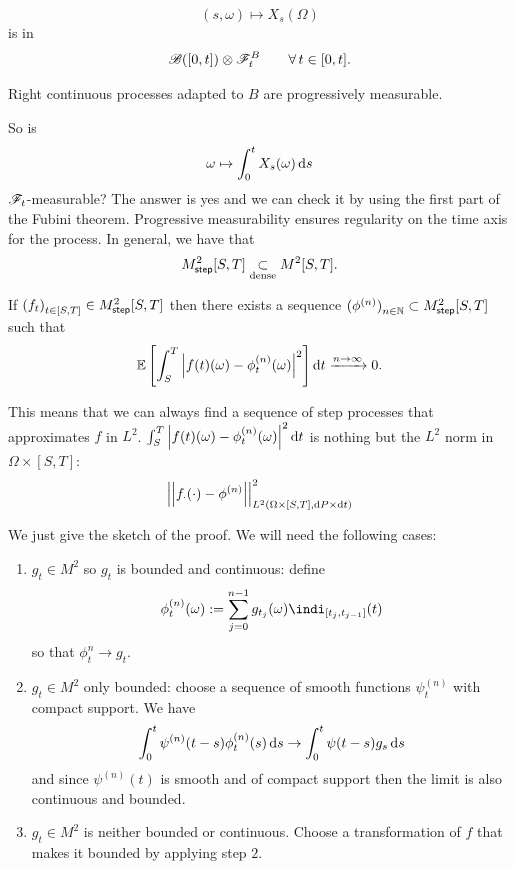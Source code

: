 \documentclass[12pt]{report}
\begin{document}
\begin{equation*}
	(s,\omega)\mapsto X_{s}(\Omega)
\end{equation*}
is in \begin{equation*}
	\mathscr{B}([0,t])\otimes\mathscr{F}^{B}_{t}\qquad\forall\, t\in[0,t].
\end{equation*}
\begin{proposition}
	Right continuous processes adapted to $B$ are progressively measurable.
\end{proposition}
So is \begin{equation*}
	\omega\mapsto\int_{0}^{t}X_{s}(\omega)\mathop{}\!\mathrm{d} s
\end{equation*}
$\mathscr{F}_{t}$-measurable? The answer is yes and we can check it by using the first part of the Fubini theorem. Progressive measurability ensures regularity on the time axis for the process. In general, we have that
\begin{equation*}
	M^{2}_{\mathsf{step}}[S,T]\underset{\text{dense}}{\subset}M^{2}[S,T].
\end{equation*}
\begin{lemma}
	If ${\left(f_{t}\right)}_{t\in[S,T]}\in M^{2}_{\mathsf{step}}[S,T]$ then there exists a sequence ${(\phi^{(n)})}_{n\in\mathbb{N}}\subset M^{2}_{\mathsf{step}}[S,T]$ such that
	\begin{equation*}
		\mathbb{E}\left[\int_{S}^{T}\left|f(t)(\omega)-\phi^{(n)}_{t}(\omega)\right|^{2}\right]\mathop{}\!\mathrm{d} t\xrightarrow{n\to\infty}0.
	\end{equation*}
\end{lemma}
This means that we can always find a sequence of step processes that approximates $f$ in $L^{2}$. $\int_{S}^{T}\left|f(t)(\omega)-\phi^{(n)}_{t}(\omega)\right|^{2}\mathop{}\!\mathrm{d} t$ is nothing but the $L^{2}$ norm in $\Omega\times[S,T]$:
\begin{equation*}
	\left|\left|f_{\cdot}(\cdot)-\phi^{(n)}\right|\right|^{2}_{L^{2}(\Omega\times[S,T],\mathop{}\!\mathrm{d} P\times\mathop{}\!\mathrm{d} t)}
\end{equation*}
\begin{fancyproof}
	We just give the sketch of the proof. We will need the following cases:
	\begin{enumerate}[\circnum]
		\item $g_{t}\in M^{2}$ so $g_{t}$ is bounded and continuous: define
		\begin{equation*}
			\phi^{(n)}_{t}(\omega):=\sum_{j=0}^{n-1}g_{t_{j}}(\omega)\indi_{[t_{j},t_{j-1}]}(t)
		\end{equation*}
		so that $\phi_{t}^{n}\to g_{t}$.
		\item $g_{t}\in M^{2}$ only bounded: choose a sequence of smooth functions $\psi^{(n)}_{t}$ with compact support. We have
		\begin{equation*}
			\int_{0}^{t}\psi^{(n)}(t-s)\phi^{(n)}_{t}(s)\mathop{}\!\mathrm{d} s\to\int_{0}^{t}\psi(t-s)g_{s}\mathop{}\!\mathrm{d} s
		\end{equation*}
		and since $\psi^{(n)}(t)$ is smooth and of compact support then the limit is also continuous and bounded.
		\item $g_{t}\in M^{2}$ is neither bounded or continuous. Choose a transformation of $f$ that makes it bounded by applying step $2$.
	\end{enumerate}
\end{fancyproof}
\end{document}
